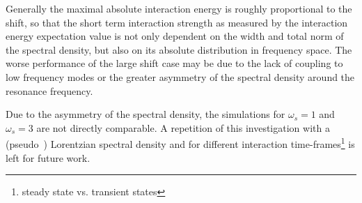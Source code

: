 


Generally the maximal absolute interaction energy is roughly
proportional to the shift, so that the short term interaction
strength as measured by the interaction energy expectation value is
not only dependent on the width and total norm of the spectral
density, but also on its absolute distribution in frequency space. The
worse performance of the large shift case may be due to the lack of
coupling to low frequency modes or the greater asymmetry of the spectral density around
the resonance frequency.

Due to the asymmetry of the spectral density, the simulations for
\(ω_s=1\) and \(ω_s=3\) are not directly comparable. A repetition of
this investigation with a (pseudo~\cite{Mukherjee2020Jan}) Lorentzian
spectral density and for different interaction
time-frames\footnote{steady state vs. transient states} is left for
future work.

